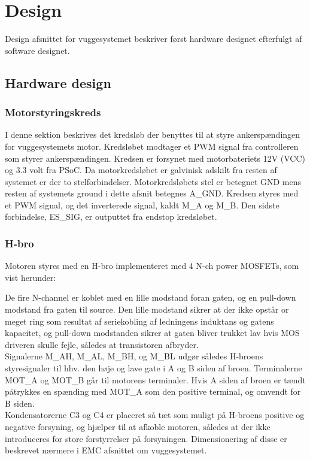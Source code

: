 \section{Design}
Design afsnittet for vuggesystemet beskriver først hardware designet efterfulgt af software designet.
\subsection{Hardware design}
\subsubsection{Motorstyringskreds}
I denne sektion beskrives det kredsløb der benyttes til at styre ankerspændingen for vuggesystemets motor. Kredsløbet modtager et PWM signal fra controlleren som styrer ankerspændingen. Kredsen er forsynet med motorbateriets 12V (VCC) og 3.3 volt fra PSoC. Da motorkredsløbet er galvinisk adskilt fra resten af systemet er der to stelforbindelser. Motorkredsløbets stel er betegnet GND mens resten af systemets ground i dette afsnit betegnes A\_GND. Kredsen styres med et PWM signal, og det inverterede signal, kaldt M\_A og M\_B. Den sidste forbindelse, ES\_SIG, er outputtet fra endstop kredsløbet.\\


\subsubsection*{H-bro}
\label{Vuggesytem:HW_DESIGN_HBRO} 
Motoren styres med en H-bro implementeret med 4 N-ch power MOSFETs, som vist herunder:


De fire N-channel er koblet med en lille modstand foran gaten, og en pull-down modstand fra gaten til source. Den lille modstand sikrer at der ikke opstår or meget ring som resultat af seriekobling af ledningens induktans og gatens kapacitet, og pull-down modstanden sikrer at gaten bliver trukket lav hvis MOS driveren skulle fejle, således at transistoren afbryder. \\ 
Signalerne M\_AH, M\_AL, M\_BH, og M\_BL udgør således H-broens styresignaler til hhv. den høje og lave gate i A og B siden af broen. Terminalerne MOT\_A og MOT\_B går til motorens terminaler. Hvis A siden af broen er tændt påtrykkes en spænding med MOT\_A som den positive terminal, og omvendt for B siden. \\
Kondensatorerne C3 og C4 er placeret så tæt som muligt på H-broens positive og negative forsyning, og hjælper til at afkoble motoren, således at der ikke introduceres for store forstyrrelser på forsyningen. Dimensionering af disse er beskrevet nærmere i EMC afsnittet om vuggesystemet.\\

